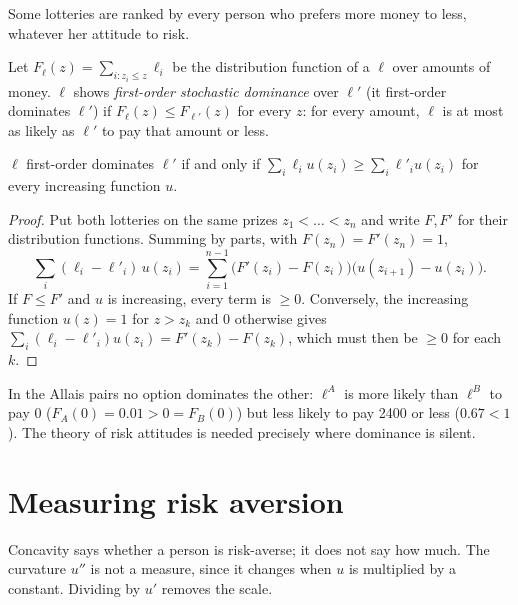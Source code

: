 Some lotteries are ranked by every person who prefers more money to less, whatever her attitude to
risk.

\begin{definition}\label{def:b2:expected-utility:fosd}
Let $F_\ell(z) = \sum_{i : z_i \le z} \ell_i$ be the distribution function of a  $\ell$ over
amounts of money. $\ell$ shows \emph{first-order stochastic dominance} over $\ell'$ (it first-order dominates $\ell'$) if $F_\ell(z) \le F_{\ell'}(z)$ for every
$z$: for every amount, $\ell$ is at most as likely as $\ell'$ to pay that amount or less.
\end{definition}

\begin{proposition}\label{prop:b2:expected-utility:fosd}
$\ell$ first-order dominates $\ell'$ if and only if $\sum_i \ell_i u(z_i) \ge \sum_i \ell'_i u(z_i)$
for every increasing function $u$.
\end{proposition}

\begin{proof}
Put both lotteries on the same prizes $z_1 < \dots < z_n$ and write $F, F'$ for their distribution
functions. Summing by parts, with $F(z_n) = F'(z_n) = 1$,
\[
\sum_i (\ell_i - \ell'_i)\,u(z_i) = \sum_{i=1}^{n-1} \bigl(F'(z_i) - F(z_i)\bigr)\bigl(u(z_{i+1}) -
u(z_i)\bigr).
\]
If $F \le F'$ and $u$ is increasing, every term is $\ge 0$. Conversely, the increasing function $u(z)
= 1$ for $z > z_k$ and $0$ otherwise gives $\sum_i (\ell_i - \ell'_i)u(z_i) = F'(z_k) - F(z_k)$, which
must then be $\ge 0$ for each $k$.
\end{proof}

In the Allais pairs no option dominates the other: $\ell^{A}$ is more likely than $\ell^{B}$ to pay
$0$ ($F_A(0) = 0.01 > 0 = F_B(0)$) but less likely to pay \num{2400} or less ($0.67 < 1$). The theory
of risk attitudes is needed precisely where dominance is silent.

\section{Measuring risk aversion}\label{sec:b2:expected-utility:arrow-pratt}

Concavity says whether a person is risk-averse; it does not say how much. The curvature $u''$ is not
a measure, since it changes when $u$ is multiplied by a constant. Dividing by $u'$ removes the scale.

